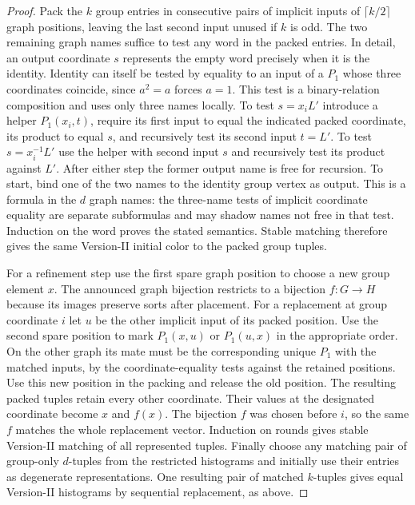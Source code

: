 \documentclass[11pt]{article}
\theoremstyle{definition}
\theoremstyle{remark}
\numberwithin{equation}{section}
\begin{document}
\begin{proof}
Pack the $k$ group entries in consecutive pairs of implicit inputs
of $\lceil k/2\rceil$ graph positions, leaving the last second input
unused if $k$ is odd. The two remaining graph names suffice to test
any word in the packed entries. In detail, an output coordinate $s$
represents the empty word precisely when it is the identity. Identity
can itself be tested by equality to an input of a $P_1$ whose three
coordinates coincide, since $a^2=a$ forces $a=1$. This test is a
binary-relation composition and uses only three names locally. To
test $s=x_i L'$ introduce a helper $P_1(x_i,t)$, require its first
input to equal the indicated packed coordinate, its product to equal
$s$, and recursively test its second input $t=L'$. To test
$s=x_i^{-1}L'$ use the helper with second input $s$ and recursively
test its product against $L'$. After either step the former output
name is free for recursion. To start, bind one of the two names to
the identity group vertex as output. This is a formula in the $d$
graph names: the three-name tests of implicit coordinate equality are
separate subformulas and may shadow names not free in that test.
Induction on the word proves the stated semantics. Stable matching
therefore gives the same Version-II initial color to the packed group
tuples.

For a refinement step use the first spare graph position to choose a
new group element $x$. The announced graph bijection restricts to a
bijection $f:G\to H$ because its images preserve sorts after
placement. For a replacement at group coordinate $i$ let $u$ be the
other implicit input of its packed position. Use the second spare
position to mark $P_1(x,u)$ or $P_1(u,x)$ in the appropriate order.
On the other graph its mate must be the corresponding unique $P_1$
with the matched inputs, by the coordinate-equality tests against the
retained positions. Use this new position in the packing and release
the old position. The resulting packed tuples retain every other coordinate. Their
values at the designated coordinate become $x$ and $f(x)$. The bijection $f$ was chosen before $i$, so
the same $f$ matches the whole replacement vector. Induction on rounds
gives stable Version-II matching of all represented tuples. Finally
choose any matching pair of group-only $d$-tuples from the restricted
histograms and initially use their entries as degenerate
representations. One resulting pair of matched $k$-tuples gives equal
Version-II histograms by sequential replacement, as above.
\end{proof}
\end{document}
